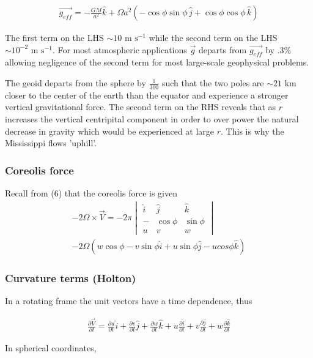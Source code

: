 \documentclass[a4paper,12pt]{article}
\begin{document}
\begin{align}
\vec{g_{eff}} = -\frac{GM}{a^2}\hat{k} + \Omega a^2(-\cos\phi\sin\phi \, \hat{j} + \cos\phi\cos\phi \, \hat{k})
\end{align}

The first term on the LHS $\sim 10 \text{ m s}^{-1}$ while the second term on the LHS $\sim 10^{-2} \text{ m s}^{-1}$. For most atmospheric applications $\vec{g}$ departs from $\vec{g_{eff}}$ by $.3\%$ allowing negligence of the second term for most large-scale geophysical problems. 

The geoid departs from the sphere by $\frac{1}{300}$ such that the two poles are $\sim 21 \text{ km}$ closer to the center of the earth than the equator and experience a stronger vertical gravitational force. The second term on the RHS reveals that as $r$ increases the vertical centripital component in order to over power the natural decrease in gravity which would be experienced at large $r$. This is why the Mississippi flows 'uphill'.

\subsubsection*{Coreolis force}
Recall from (6) that the coreolis force is given
\begin{align}
-2\Omega \times \vec{V} = -2\pi\begin{vmatrix} \hat{i} & \hat{j} & \hat{k} \\ - & \cos\phi & \sin\phi \\ u & v & w \end{vmatrix}\\
-2\Omega(w\cos\phi-v\sin\phi \hat{i} + u\sin\phi \hat{j} - ucos\phi\hat{k})
\end{align}

\subsubsection*{Curvature terms (Holton)}
In a rotating frame the unit vectors have a time dependence, thus

\begin{align}
\frac{\partial\vec{V}}{\partial t} = \frac{\partial u}{\partial t} \hat{i} + \frac{\partial v}{\partial t} \hat{j} + \frac{\partial w}{\partial t} \hat{k} + u\frac{\partial \hat{i}}{\partial t} + v\frac{\partial \hat{j}}{\partial t} + w\frac{\partial \hat{k}}{\partial t}
\end{align}

In spherical coordinates,
\end{document}
